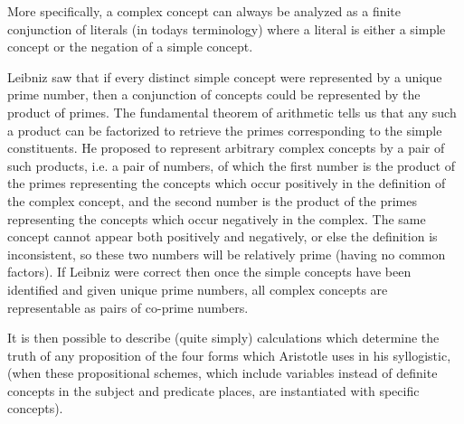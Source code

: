 More specifically, a complex concept can always be analyzed as a finite conjunction of literals (in todays terminology) where a literal is either a simple concept or the negation of a simple concept.

Leibniz saw that if every distinct simple concept were represented by a unique prime number, then a conjunction of concepts could be represented by the product of primes.
The fundamental theorem of arithmetic tells us that any such a product can be factorized to retrieve the primes corresponding to the simple constituents.
He proposed to represent arbitrary complex concepts by a pair of such products, i.e. a pair of numbers, of which the first number is the product of the primes representing the concepts which occur positively in the definition of the complex concept, and the second number is the product of the primes representing the concepts which occur negatively in the complex.
The same concept cannot appear both positively and negatively, or else the definition is inconsistent, so these two numbers will be relatively prime (having no common factors).
If Leibniz were correct then once the simple concepts have been identified and given unique prime numbers, all complex concepts are representable as pairs of co-prime numbers.

It is then possible to describe (quite simply) calculations which determine the truth of any proposition of the four forms which Aristotle uses in his syllogistic, (when these propositional schemes, which include variables instead of definite concepts in the subject and predicate places, are instantiated with specific concepts).







 

